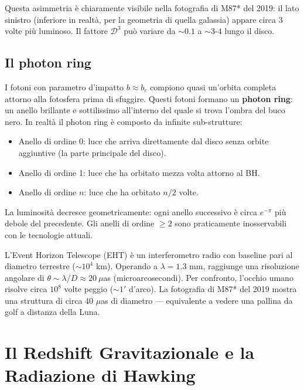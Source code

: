 \documentclass[12pt, a4paper, twoside]{article}
\newenvironment{curiosity}[1]{%
  \begin{tcolorbox}[curiositybox, title={Curiosit\`a: #1}]
}{%
  \end{tcolorbox}
}
\theoremstyle{definition}
\newcommand{\bc}{b_{\!c}}          %
\begin{document}
Questa asimmetria è chiaramente visibile nella fotografia di M87* del 2019:
il lato sinistro (inferiore in realtà, per la geometria di quella galassia)
appare circa 3 volte più luminoso. Il fattore $\mathcal{D}^3$ può variare
da $\sim 0.1$ a $\sim 3$-$4$ lungo il disco.

\subsection{Il photon ring}

I fotoni con parametro d'impatto $b \approx \bc$ compiono quasi un'orbita
completa attorno alla fotosfera prima di sfuggire. Questi fotoni formano un
\textbf{photon ring}: un anello brillante e sottilissimo all'interno del quale
si trova l'ombra del buco nero. In realtà il photon ring è composto da
infinite sub-strutture:
\begin{itemize}
  \item Anello di ordine 0: luce che arriva direttamente dal disco senza
        orbite aggiuntive (la parte principale del disco).
  \item Anello di ordine 1: luce che ha orbitato mezza volta attorno al BH.
  \item Anello di ordine $n$: luce che ha orbitato $n/2$ volte.
\end{itemize}
La luminosità decresce geometricamente: ogni anello successivo è circa
$e^{-\pi}$ più debole del precedente. Gli anelli di ordine $\geq 2$ sono
praticamente inosservabili con le tecnologie attuali.

\begin{curiosity}{La vera risoluzione di EHT}
  L'Event Horizon Telescope (EHT) è un interferometro radio con baseline pari
  al diametro terrestre ($\sim 10^4$ km). Operando a $\lambda = 1.3$ mm,
  raggiunge una risoluzione angolare di $\theta \sim \lambda/D \approx
  20\ \mu$as (microarcosecondi). Per confronto, l'occhio umano risolve
  circa $10^8$ volte peggio ($\sim 1'$ d'arco). La fotografia di M87* del
  2019 mostra una struttura di circa 40 $\mu$as di diametro — equivalente
  a vedere una pallina da golf a distanza della Luna.
\end{curiosity}

\newpage

\section{Il Redshift Gravitazionale e la Radiazione di Hawking}
\end{document}
